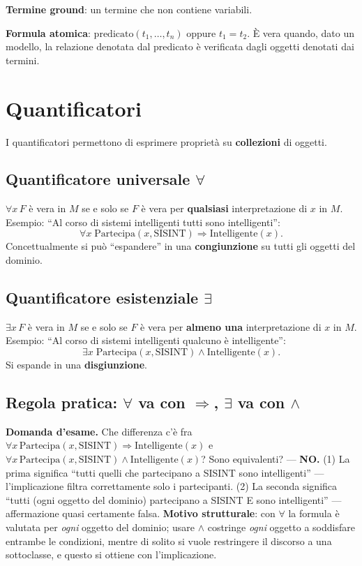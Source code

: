 \documentclass[11pt,a4paper]{report}
\newcommand{\domandaesame}[1]{\begin{esame}\textbf{Domanda d'esame.} #1\end{esame}}
\begin{document}
\textbf{Termine ground}: un termine che non contiene variabili.

\textbf{Formula atomica}: $\text{predicato}(t_1,\dots,t_n)$ oppure $t_1=t_2$. È vera quando, dato un modello, la relazione denotata dal predicato è verificata dagli oggetti denotati dai termini.

\section{Quantificatori}

I quantificatori permettono di esprimere proprietà su \textbf{collezioni} di oggetti.

\subsection*{Quantificatore universale $\forall$}

$\forall x\, F$ è vera in $M$ se e solo se $F$ è vera per \textbf{qualsiasi} interpretazione di $x$ in $M$. Esempio: ``Al corso di sistemi intelligenti tutti sono intelligenti'':
\[
\forall x\; \text{Partecipa}(x,\text{SISINT}) \Rightarrow \text{Intelligente}(x).
\]
Concettualmente si può ``espandere'' in una \textbf{congiunzione} su tutti gli oggetti del dominio.

\subsection*{Quantificatore esistenziale $\exists$}

$\exists x\, F$ è vera in $M$ se e solo se $F$ è vera per \textbf{almeno una} interpretazione di $x$ in $M$. Esempio: ``Al corso di sistemi intelligenti qualcuno è intelligente'':
\[
\exists x\; \text{Partecipa}(x,\text{SISINT}) \wedge \text{Intelligente}(x).
\]
Si espande in una \textbf{disgiunzione}.

\subsection*{Regola pratica: $\forall$ va con $\Rightarrow$, $\exists$ va con $\wedge$}

\domandaesame{Che differenza c'è fra $\forall x\, \text{Partecipa}(x,\text{SISINT}) \Rightarrow \text{Intelligente}(x)$ e $\forall x\, \text{Partecipa}(x,\text{SISINT}) \wedge \text{Intelligente}(x)$? Sono equivalenti? --- \textbf{NO.} (1) La prima significa ``tutti quelli che partecipano a SISINT sono intelligenti'' --- l'implicazione filtra correttamente solo i partecipanti. (2) La seconda significa ``tutti (ogni oggetto del dominio) partecipano a SISINT E sono intelligenti'' --- affermazione quasi certamente falsa. \textbf{Motivo strutturale}: con $\forall$ la formula è valutata per \emph{ogni} oggetto del dominio; usare $\wedge$ costringe \emph{ogni} oggetto a soddisfare entrambe le condizioni, mentre di solito si vuole restringere il discorso a una sottoclasse, e questo si ottiene con l'implicazione.}
\end{document}
